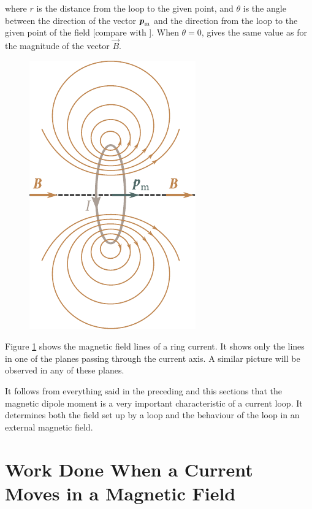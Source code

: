 \noindent
where $r$ is the distance from the loop to the given point, and $\theta$ is the angle between the direction of the vector $\boldsymbol{p}_{\text{m}}$ and the direction from the loop to the given point of the field [compare with ]. When $\theta=0$,  gives the same value as  for the magnitude of the vector $\vec{B}$.

\begin{figure}[t]
	\begin{center}
		\includegraphics[scale=1]{figures/ch_06/fig_6_20.pdf}
		\caption[]{}
		\label{fig:6_20}
	\end{center}
	\vspace{-0.8cm}
\end{figure}

Figure \ref{fig:6_20} shows the magnetic field lines of a ring current. It shows only the lines in one of the planes passing through the current axis. A similar picture will be observed in any of these planes.

It follows from everything said in the preceding and this sections that the magnetic dipole moment is a very important characteristic of a current loop. It determines both the field set up by a loop and the behaviour of the loop in an external magnetic field.

\section{Work Done When a Current Moves in a Magnetic Field}\label{6_10}

